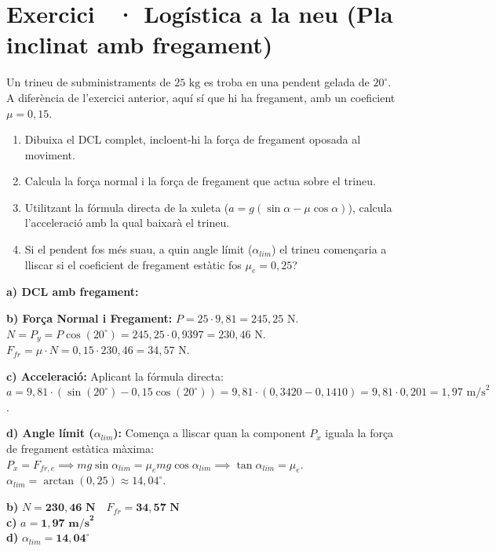 \documentclass[12pt,a4paper,twoside]{article}
\newcounter{exercici}
\newcommand{\exercici}[1]{%
  \stepcounter{exercici}
  \section*{Exercici \theexercici\ \textnormal{· #1}}
  \vspace{-10pt}
}
\begin{document}
\clearpage
\exercici{Logística a la neu (Pla inclinat amb fregament)}
Un trineu de subministraments de $25 \text{ kg}$ es troba en una pendent gelada de $20^\circ$. A diferència de l'exercici anterior, aquí sí que hi ha fregament, amb un coeficient $\mu = 0{,}15$.
\begin{enumerate}[label=\textbf{\alph*)}]
  \item Dibuixa el DCL complet, incloent-hi la força de fregament oposada al moviment.
  \item Calcula la força normal i la força de fregament que actua sobre el trineu.
  \item Utilitzant la fórmula directa de la xuleta ($a = g(\sin \alpha - \mu \cos \alpha)$), calcula l'acceleració amb la qual baixarà el trineu.
  \item Si el pendent fos més suau, a quin angle límit ($\alpha_{lim}$) el trineu començaria a lliscar si el coeficient de fregament estàtic fos $\mu_e = 0{,}25$?
\end{enumerate}

{\color{blue}
\textbf{a) DCL amb fregament:}
\begin{center}
\end{center}

\textbf{b) Força Normal i Fregament:}
$P = 25 \cdot 9{,}81 = 245{,}25\text{ N}$.\\
$N = P_y = P \cos(20^\circ) = 245{,}25 \cdot 0{,}9397 = 230{,}46\text{ N}$.\\
$F_{fr} = \mu \cdot N = 0{,}15 \cdot 230{,}46 = 34{,}57\text{ N}$.

\textbf{c) Acceleració:}
Aplicant la fórmula directa: $a = 9{,}81 \cdot (\sin(20^\circ) - 0{,}15 \cos(20^\circ)) = 9{,}81 \cdot (0{,}3420 - 0{,}1410) = 9{,}81 \cdot 0{,}201 = 1{,}97\text{ m/s}^2$.

\textbf{d) Angle límit ($\alpha_{lim}$):}
Comença a lliscar quan la component $P_x$ iguala la força de fregament estàtica màxima:
$P_x = F_{fr,e} \implies m g \sin \alpha_{lim} = \mu_e m g \cos \alpha_{lim} \implies \tan \alpha_{lim} = \mu_e$.\\
$\alpha_{lim} = \arctan(0{,}25) \approx 14{,}04^\circ$.

\begin{tcolorbox}[title=Respostes Finals,colframe=red!70!black,colback=red!5,sharp corners=south,fontupper=\color{blue}]
\textbf{b)} $N = \mathbf{230{,}46\text{ N}} \quad F_{fr} = \mathbf{34{,}57\text{ N}}$\\
\textbf{c)} $a = \mathbf{1{,}97\text{ m/s}^2}$\\
\textbf{d)} $\alpha_{lim} = \mathbf{14{,}04^\circ}$
\end{tcolorbox}
}
\end{document}
